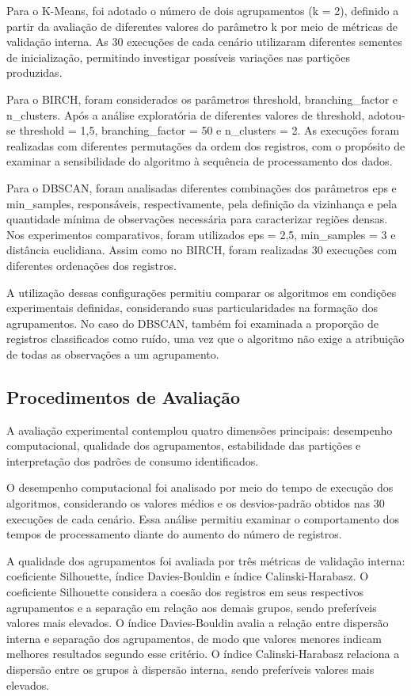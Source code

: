 \documentclass[lettersize,journal]{IEEEtran}
\begin{document}
Para o K-Means, foi adotado o número de dois agrupamentos (k = 2), definido a partir da avaliação de diferentes valores do parâmetro k por meio de métricas de validação interna. As 30 execuções de cada cenário utilizaram diferentes sementes de inicialização, permitindo investigar possíveis variações nas partições produzidas.

Para o BIRCH, foram considerados os parâmetros threshold, branching\_factor e n\_clusters. Após a análise exploratória de diferentes valores de threshold, adotou-se threshold = 1,5, branching\_factor = 50 e n\_clusters = 2. As execuções foram realizadas com diferentes permutações da ordem dos registros, com o propósito de examinar a sensibilidade do algoritmo à sequência de processamento dos dados.

Para o DBSCAN, foram analisadas diferentes combinações dos parâmetros eps e min\_samples, responsáveis, respectivamente, pela definição da vizinhança e pela quantidade mínima de observações necessária para caracterizar regiões densas. Nos experimentos comparativos, foram utilizados eps = 2,5, min\_samples = 3 e distância euclidiana. Assim como no BIRCH, foram realizadas 30 execuções com diferentes ordenações dos registros.

A utilização dessas configurações permitiu comparar os algoritmos em condições experimentais definidas, considerando suas particularidades na formação dos agrupamentos. No caso do DBSCAN, também foi examinada a proporção de registros classificados como ruído, uma vez que o algoritmo não exige a atribuição de todas as observações a um agrupamento.


\subsection{Procedimentos de Avaliação}
A avaliação experimental contemplou quatro dimensões principais: desempenho computacional, qualidade dos agrupamentos, estabilidade das partições e interpretação dos padrões de consumo identificados.

O desempenho computacional foi analisado por meio do tempo de execução dos algoritmos, considerando os valores médios e os desvios-padrão obtidos nas 30 execuções de cada cenário. Essa análise permitiu examinar o comportamento dos tempos de processamento diante do aumento do número de registros.

A qualidade dos agrupamentos foi avaliada por três métricas de validação interna: coeficiente Silhouette, índice Davies-Bouldin e índice Calinski-Harabasz. O coeficiente Silhouette considera a coesão dos registros em seus respectivos agrupamentos e a separação em relação aos demais grupos, sendo preferíveis valores mais elevados. O índice Davies-Bouldin avalia a relação entre dispersão interna e separação dos agrupamentos, de modo que valores menores indicam melhores resultados segundo esse critério. O índice Calinski-Harabasz relaciona a dispersão entre os grupos à dispersão interna, sendo preferíveis valores mais elevados.
\end{document}

